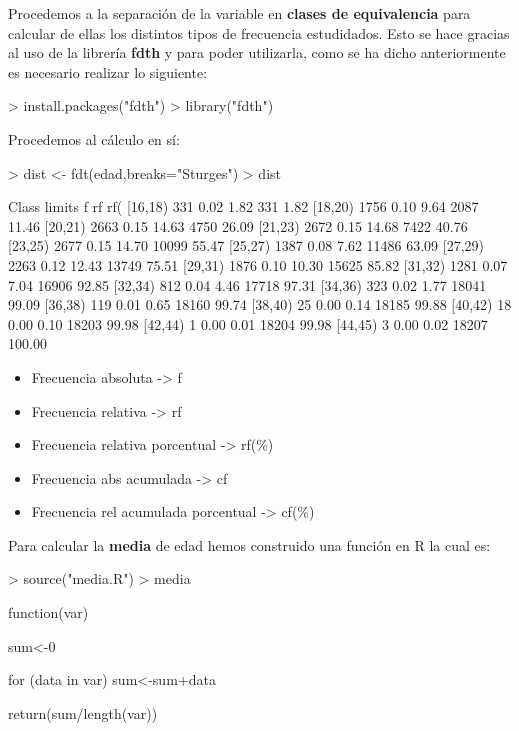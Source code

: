 \documentclass [a4paper] {article}
\begin{document}
\bigskip
Procedemos a la separaci\'on de la variable en \textbf{clases de equivalencia} para calcular de ellas los distintos tipos de
frecuencia estudidados. Esto se hace gracias al uso de la librer\'ia \textbf{fdth} y para poder utilizarla, como se ha dicho 
anteriormente es necesario realizar lo siguiente:
\begin{Schunk}
\begin{Sinput}
> install.packages("fdth")
> library("fdth")
\end{Sinput}
\end{Schunk}

Procedemos al c\'alculo en s\'i:
\begin{Schunk}
\begin{Sinput}
> dist <- fdt(edad,breaks="Sturges")
> dist
\end{Sinput}
\begin{Soutput}
 Class limits    f   rf rf(%
      [16,18)  331 0.02  1.82   331   1.82
      [18,20) 1756 0.10  9.64  2087  11.46
      [20,21) 2663 0.15 14.63  4750  26.09
      [21,23) 2672 0.15 14.68  7422  40.76
      [23,25) 2677 0.15 14.70 10099  55.47
      [25,27) 1387 0.08  7.62 11486  63.09
      [27,29) 2263 0.12 12.43 13749  75.51
      [29,31) 1876 0.10 10.30 15625  85.82
      [31,32) 1281 0.07  7.04 16906  92.85
      [32,34)  812 0.04  4.46 17718  97.31
      [34,36)  323 0.02  1.77 18041  99.09
      [36,38)  119 0.01  0.65 18160  99.74
      [38,40)   25 0.00  0.14 18185  99.88
      [40,42)   18 0.00  0.10 18203  99.98
      [42,44)    1 0.00  0.01 18204  99.98
      [44,45)    3 0.00  0.02 18207 100.00
\end{Soutput}
\end{Schunk}

\begin{itemize}
\item Frecuencia absoluta -> f
\item Frecuencia relativa -> rf
\item Frecuencia relativa porcentual -> rf(\%)
\item Frecuencia abs acumulada -> cf
\item Frecuencia rel acumulada porcentual -> cf(\%)
\end{itemize}

\bigskip
Para calcular la \textbf{media} de edad hemos construido una funci\'on en R la cual es:
\begin{Schunk}
\begin{Sinput}
> source("media.R")
> media
\end{Sinput}
\begin{Soutput}
function(var) {
    sum<-0

    for (data in var) {
        sum<-sum+data
    }

    return(sum/length(var))
}
\end{Soutput}
\end{Schunk}
\end{document}
